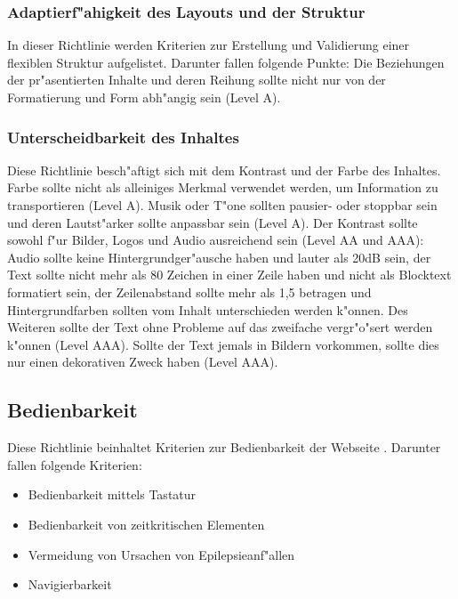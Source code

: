 \documentclass[a4paper,bibtotoc,oneside]{scrbook}
\begin{document}
\subsubsection{Adaptierf"ahigkeit des Layouts und der Struktur}
In dieser Richtlinie werden Kriterien zur Erstellung und Validierung einer flexiblen Struktur aufgelistet. Darunter fallen folgende Punkte: Die Beziehungen der pr"asentierten Inhalte und deren Reihung sollte nicht nur von der Formatierung und Form abh"angig sein (Level A).\cite[Abschnitt 1.3]{wcag2}

\subsubsection{Unterscheidbarkeit des Inhaltes}
Diese Richtlinie besch"aftigt sich mit dem Kontrast und der Farbe des Inhaltes. Farbe sollte nicht als alleiniges Merkmal verwendet werden, um Information zu transportieren (Level A). Musik oder T"one sollten pausier- oder stoppbar sein und deren Lautst"arker sollte anpassbar sein (Level A). Der Kontrast sollte sowohl f"ur Bilder, Logos und Audio ausreichend sein (Level AA und AAA): Audio sollte keine Hintergrundger"ausche haben und lauter als 20dB sein, der Text sollte nicht mehr als 80 Zeichen in einer Zeile haben und nicht als Blocktext formatiert sein, der Zeilenabstand sollte mehr als 1,5 betragen und Hintergrundfarben sollten vom Inhalt unterschieden werden k"onnen. Des Weiteren sollte der Text ohne Probleme auf das zweifache vergr"o"sert werden k"onnen (Level AAA). Sollte der Text jemals in Bildern vorkommen, sollte dies nur einen dekorativen Zweck haben (Level AAA). \cite[Abschnitt 1.4]{wcag2}



\subsection{Bedienbarkeit}
Diese Richtlinie beinhaltet Kriterien zur Bedienbarkeit der Webseite \cite[Abschnitt 2]{wcag2}. Darunter fallen folgende Kriterien: 

\begin{itemize}
\item Bedienbarkeit mittels Tastatur \cite[Abschnitt 2.1]{wcag2}
\item Bedienbarkeit von zeitkritischen Elementen \cite[Abschnitt 2.2]{wcag2}
\item Vermeidung von Ursachen von Epilepsieanf"allen \cite[Abschnitt 2.3]{wcag2}
\item Navigierbarkeit \cite[Abschnitt 2.4]{wcag2}
\end{itemize}
\end{document}
